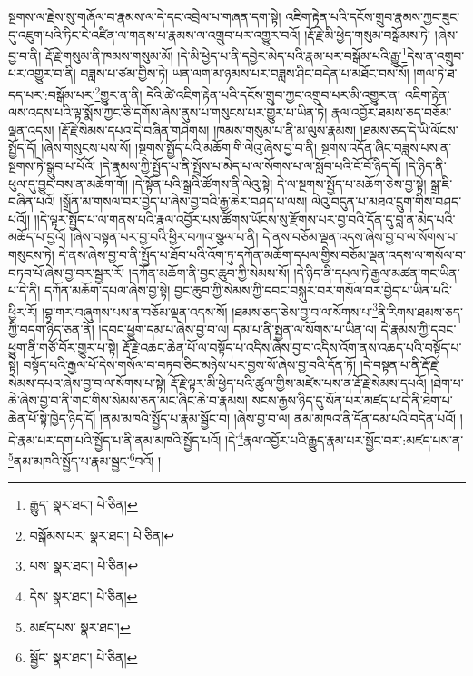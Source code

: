 སྔགས་ལ་རྗེས་སུ་གཞོལ་བ་རྣམས་ལ་དེ་དང་འབྲེལ་པ་གཞན་དག་སྟེ། འཇིག་རྟེན་པའི་དངོས་གྲུབ་རྣམས་ཀྱང་ཟུང་དུ་འཇུག་པའི་ཏིང་ངེ་འཛིན་ལ་གནས་པ་རྣམས་ལ་འགྲུབ་པར་འགྱུར་བའོ། །རྡོ་རྗེ་མི་ཕྱེད་གསུམ་བསྒོམས་ཏེ། །ཞེས་བྱ་བ་ནི། རྡོ་རྗེ་གསུམ་ནི་ཁམས་གསུམ་མོ། །དེ་མི་ཕྱེད་པ་ནི་དབྱེར་མེད་པའི་རྣམ་པར་བསྒོམ་པའི་རྒྱུ་\footnote{རྒྱུད་  སྣར་ཐང་།  པེ་ཅིན། }དེས་ན་འགྲུབ་པར་འགྱུར་བ་ནི། བཟླས་པ་ཙམ་གྱིས་ཏེ། ཡན་ལག་མ་ཉམས་པར་བཟླས་ཤིང་བདེན་པ་མཐོང་བས་སོ། །གལ་ཏེ་ཐ་དད་པར་:བསྒོམ་པར་\footnote{བསྒོམས་པར་  སྣར་ཐང་།  པེ་ཅིན། }གྱུར་ན་ནི། དེའི་ཚེ་འཇིག་རྟེན་པའི་དངོས་གྲུབ་ཀྱང་འགྲུབ་པར་མི་འགྱུར་ན། འཇིག་རྟེན་ལས་འདས་པའི་ལྟ་སྨོས་ཀྱང་ཅི་དགོས་ཞེས་ནུས་པ་གསུངས་པར་གྱུར་པ་ཡིན་ཏེ། རྣལ་འབྱོར་ཐམས་ཅད་བཅོམ་ལྡན་འདས། །རྡོ་རྗེ་སེམས་དཔའ་དེ་བཞིན་གཤེགས། །ཁམས་གསུམ་པ་ནི་མ་ལུས་རྣམས། །ཐམས་ཅད་དེ་ཡི་ལོངས་སྤྱོད་དོ། །ཞེས་གསུངས་པས་སོ། །སྔགས་སྤྱོད་པའི་མཆོག་གི་ལེའུ་ཞེས་བྱ་བ་ནི། སྔགས་འདོན་ཞིང་བཟླས་པས་ན་སྔགས་ཏེ་སྒྲུབ་པ་པོའོ། །དེ་རྣམས་ཀྱི་སྤྱོད་པ་ནི་སྤྲོས་པ་མེད་པ་ལ་སོགས་པ་ལ་སློབ་པའི་ངོ་བོ་ཉིད་དོ། །དེ་ཉིད་ནི་ཕུལ་དུ་བྱུང་བས་ན་མཆོག་གོ། །དེ་སྟོན་པའི་སྒྲའི་ཚོགས་ནི་ལེའུ་སྟེ། དེ་ལ་སྔགས་སྤྱོད་པ་མཆོག་ཅེས་བྱ་སྟེ། སྒྲ་ཇི་བཞིན་པའོ། །སྒྲོན་མ་གསལ་བར་བྱེད་པ་ཞེས་བྱ་བའི་རྒྱ་ཆེར་བཤད་པ་ལས། ལེའུ་བདུན་པ་མཐའ་དྲུག་གིས་བཤད་པའོ།། །།དེ་ལྟར་སྤྱོད་པ་ལ་གནས་པའི་རྣལ་འབྱོར་པས་ཚོགས་ཡོངས་སུ་རྫོགས་པར་བྱ་བའི་དོན་དུ་བླ་ན་མེད་པའི་མཆོད་པ་བྱའོ། །ཞེས་བསྟན་པར་བྱ་བའི་ཕྱིར་བཀའ་སྩལ་པ་ནི། དེ་ནས་བཅོམ་ལྡན་འདས་ཞེས་བྱ་བ་ལ་སོགས་པ་གསུངས་ཏེ། དེ་ནས་ཞེས་བྱ་བ་ནི་སྤྱོད་པ་ཐོབ་པའི་འོག་ཏུ་དཀོན་མཆོག་དཔལ་གྱིས་བཅོམ་ལྡན་འདས་ལ་གསོལ་བ་བཏབ་པོ་ཞེས་བྱ་བར་སྦྱར་རོ། །དཀོན་མཆོག་ནི་བྱང་ཆུབ་ཀྱི་སེམས་སོ། །དེ་ཉིད་ནི་དཔལ་ཏེ་རྒྱལ་མཚན་གང་ཡིན་པ་དེ་ནི། དཀོན་མཆོག་དཔལ་ཞེས་བྱ་སྟེ། བྱང་ཆུབ་ཀྱི་སེམས་ཀྱི་དབང་བསྐུར་བར་གསོལ་བར་བྱེད་པ་ཡིན་པའི་ཕྱིར་རོ། །བྷ་གར་བཞུགས་པས་ན་བཅོམ་ལྡན་འདས་སོ། །ཐམས་ཅད་ཅེས་བྱ་བ་ལ་སོགས་པ་\footnote{པས་  སྣར་ཐང་།  པེ་ཅིན། }ནི་རིགས་ཐམས་ཅད་ཀྱི་བདག་ཉིད་ཅན་ནོ། །དབང་ཕྱུག་དམ་པ་ཞེས་བྱ་བ་ལ། དམ་པ་ནི་སྤྱན་ལ་སོགས་པ་ཡིན་ལ། དེ་རྣམས་ཀྱི་དབང་ཕྱུག་ནི་གཙོ་བོར་གྱུར་པ་སྟེ། རྡོ་རྗེ་འཆང་ཆེན་པོ་ལ་བསྟོད་པ་འདིས་ཞེས་བྱ་བ་འདིས་འོག་ནས་འཆད་པའི་བསྟོད་པ་སྟེ། བསྟོད་པའི་རྒྱལ་པོ་དེས་གསོལ་བ་བཏབ་ཅིང་མཉེས་པར་བྱས་སོ་ཞེས་བྱ་བའི་དོན་ཏོ། །དེ་བསྟན་པ་ནི་རྡོ་རྗེ་སེམས་དཔའ་ཞེས་བྱ་བ་ལ་སོགས་པ་སྟེ། རྡོ་རྗེ་ལྟར་མི་ཕྱེད་པའི་ཚུལ་གྱིས་མཛེས་པས་ན་རྡོ་རྗེ་སེམས་དཔའོ། །ཐེག་པ་ཆེ་ཞེས་བྱ་བ་ནི་གང་གིས་སེམས་ཅན་མང་ཞིང་ཆེ་བ་རྣམས། སངས་རྒྱས་ཉིད་དུ་སོན་པར་མཛད་པ་དེ་ནི་ཐེག་པ་ཆེན་པོ་སྟེ་ཁྱེད་ཉིད་དོ། །ནམ་མཁའི་སྤྱོད་པ་རྣམ་སྦྱོང་བ། །ཞེས་བྱ་བ་ལ། ནམ་མཁའ་ནི་དོན་དམ་པའི་བདེན་པའོ། །དེ་རྣམ་པར་དག་པའི་སྤྱོད་པ་ནི་ནམ་མཁའི་སྤྱོད་པའོ། །དེ་\footnote{དེས་  སྣར་ཐང་།  པེ་ཅིན། }རྣལ་འབྱོར་པའི་རྒྱུད་རྣམ་པར་སྦྱོང་བར་:མཛད་པས་ན་\footnote{མཛད་པས་  སྣར་ཐང་། }ནམ་མཁའི་སྤྱོད་པ་རྣམ་སྦྱང་\footnote{སྦྱོང་  སྣར་ཐང་།  པེ་ཅིན། }བའོ། །
